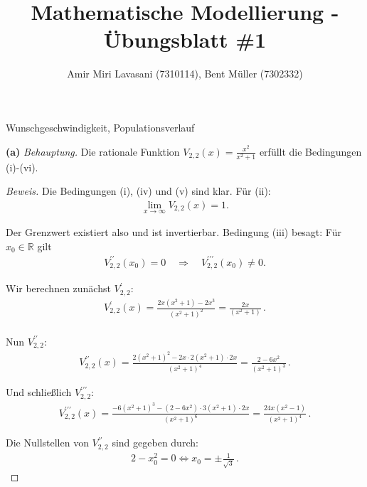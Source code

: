 \documentclass[10pt]{article}
\newcommand{\R}{\mathbb{R}}
\newcommand{\beh}{\textit{Behauptung. }}
\newenvironment{Aufgabe}[2][Aufgabe]{\begin{trivlist}
\item[\hskip \labelsep {\bfseries #1}\hskip \labelsep {\bfseries #2.}]}{\end{trivlist}}
\begin{document}
 
\title{ \textbf{Mathematische Modellierung - Übungsblatt \#1} }

\author{Amir Miri Lavasani (7310114), Bent Müller (7302332)} \maketitle

 
\begin{Aufgabe}{2}
    Wunschgeschwindigkeit, Populationsverlauf
\end{Aufgabe}

\textbf{(a)} \beh Die rationale Funktion $V_{2,2}(x) = \frac{x^2}{x^2 + 1}$ erfüllt die Bedingungen (i)-(vi).
\begin{proof}[Beweis]
    Die Bedingungen (i), (iv) und (v) sind klar. Für (ii): 
    \begin{align*}
        \lim_{x\to\infty} V_{2,2}(x) = 1. 
    \end{align*}

    Der Grenzwert existiert also und ist invertierbar. 
    Bedingung (iii) besagt: Für $x_0\in\R$ gilt
    \begin{align*}
        V_{2,2}^{\prime\prime}(x_0) = 0 \quad\Longrightarrow\quad V_{2,2}^{\prime\prime\prime}(x_0) \neq 0.
    \end{align*}

    Wir berechnen zunächst $V_{2,2}^{\prime}$: 
    \begin{align*}
        V_{2,2}^{\prime}(x) = \frac{2x(x^2+1)-2x^3}{(x^2+1)^2} = \frac{2x}{(x^2+1)} \,. \\
    \end{align*}

    Nun $V_{2,2}^{\prime\prime}$:
    \begin{align*}
        V_{2,2}^{\prime\prime}(x) = \frac{2(x^2+1)^2 - 2x\cdot 2 (x^2+1)\cdot 2x}{(x^2+1)^4} 
                                  = \frac{2-6x^2}{(x^2+1)^3} \,. 
    \end{align*}
    
    Und schließlich $V_{2,2}^{\prime\prime\prime}$:
    \begin{align*}
        V_{2,2}^{\prime\prime\prime}(x) = \frac{-6(x^2+1)^3 - (2-6x^2)\cdot 3(x^2 + 1)\cdot 2x}{(x^2+1)^6} 
                                        = \frac{24x(x^2-1)}{(x^2+1)^4} \,.
    \end{align*}

    Die Nullstellen von $V_{2,2}^{\prime\prime}$ sind gegeben durch:
    \begin{align*}
        2 - x_0^2 = 0 \Longleftrightarrow x_0 = \pm\frac{1}{\sqrt{3}} \,.
    \end{align*}


\end{proof}
\end{document}
